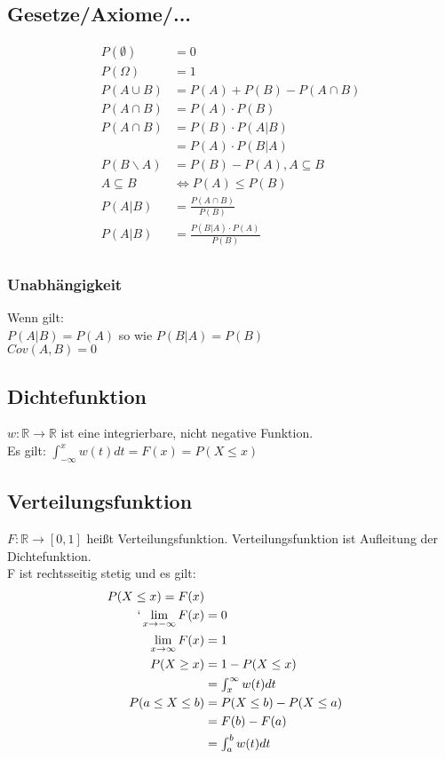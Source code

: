 \documentclass[a4paper, 8pt, landscape]{extarticle}
\newcommand{\limFromTo}[2]{ \lim\limits_{#2 \rightarrow #1}}
\let\oldint\int
\renewcommand{\int}{\ensuremath{\textstyle\oldint}}
\begin{document}
\begin{multicols*}{5}
	    \subsection{Gesetze/Axiome/...}
		    \begin{align*}
		    	P(\emptyset) &= 0\\
		    	P(\Omega) &= 1\\
		    	P(A \cup B) &= P(A) + P(B)-P(A \cap B)\\
		    	P(A \cap B) &= P(A) \cdot P(B)\\
		    	P(A\cap B) &= P(B) \cdot P(A|B)\\
		    	&= P(A) \cdot P(B|A)\\
		    	P(B \backslash A) &= P(B) - P(A), A \subseteq B\\
		    	A \subseteq B &\iff P(A) \leq P(B)\\
		    	P(A|B) &= \frac{P(A \cap B)}{P(B)} \\
		    	P(A|B) &= \frac{P(B|A)\cdot P(A)}{P(B)} \\
	    	\end{align*}
	    	\subsubsection{Unabhängigkeit}
	    		Wenn gilt:\\
	    		$P(A|B)=P(A)$ so wie $P(B|A)=P(B)$\\
	    		$Cov(A,B)=0$
	    		
		\subsection{Dichtefunktion}
		    $w: \mathbb{R} \rightarrow \mathbb{R}$ ist eine integrierbare, nicht negative Funktion. \\
	    	Es gilt: $\int_{-\infty}^{x} w(t) dt = F(x) = P(X \leq x)$
	    \subsection{Verteilungsfunktion}
	    	$F: \mathbb{R} \rightarrow \left[0,1\right]$ heißt Verteilungsfunktion. Verteilungsfunktion ist Aufleitung der Dichtefunktion.\\
	    	F ist rechtsseitig stetig und es gilt:
	    	\begin{align*}
	    		P(X\leq x) = F(x)\\`
	    		\limFromTo{-\infty}{x} F(x) &= 0\\
	    		\limFromTo{\infty}{x} F(x) &= 1\\
	    		P(X \geq x) &= 1 - P(X \leq x) \\
	    		&= \int_{x}^{\infty} w(t)dt\\
	    		P(a \le X \le b) &= P(X \le b) - P(X \le a)\\
	    		&= F(b) - F(a) \\
	    		&= \int_{a}^{b} w(t)dt
	    	\end{align*}

\end{multicols*}
\end{document}
